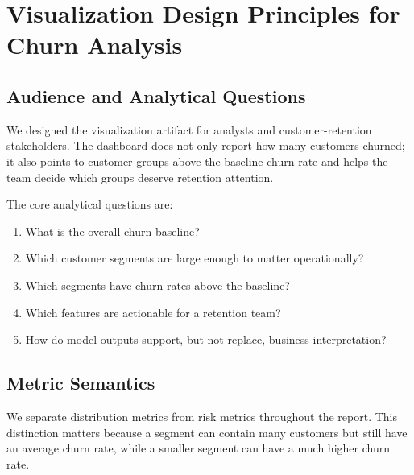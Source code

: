 \section{Visualization Design Principles for Churn Analysis}

\subsection{Audience and Analytical Questions}
We designed the visualization artifact for analysts and customer-retention
stakeholders. The dashboard does not only report how many customers churned; it
also points to customer groups above the baseline churn rate and helps the team
decide which groups deserve retention attention.

The core analytical questions are:
\begin{enumerate}
  \item What is the overall churn baseline?
  \item Which customer segments are large enough to matter operationally?
  \item Which segments have churn rates above the baseline?
  \item Which features are actionable for a retention team?
  \item How do model outputs support, but not replace, business interpretation?
\end{enumerate}

\subsection{Metric Semantics}
We separate distribution metrics from risk metrics throughout the report. This
distinction matters because a segment can contain many customers but still have
an average churn rate, while a smaller segment can have a much higher churn
rate.

